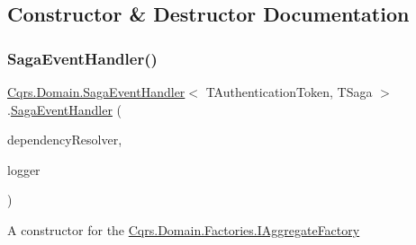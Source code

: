 \subsection{Constructor \& Destructor Documentation}
\mbox{\label{classCqrs_1_1Domain_1_1SagaEventHandler_a4ad68643dd845330a96c71039cf0897f}} 
\subsubsection{\texorpdfstring{Saga\+Event\+Handler()}{SagaEventHandler()}\hspace{0.1cm}{\footnotesize\ttfamily [1/2]}}
{\footnotesize\ttfamily \hyperlink{classCqrs_1_1Domain_1_1SagaEventHandler}{Cqrs.\+Domain.\+Saga\+Event\+Handler}$<$ T\+Authentication\+Token, T\+Saga $>$.\hyperlink{classCqrs_1_1Domain_1_1SagaEventHandler}{Saga\+Event\+Handler} (\begin{DoxyParamCaption}\item[{\hyperlink{interfaceCqrs_1_1Configuration_1_1IDependencyResolver}{I\+Dependency\+Resolver}}]{dependency\+Resolver,  }\item[{I\+Logger}]{logger }\end{DoxyParamCaption})\hspace{0.3cm}{\ttfamily [protected]}}



A constructor for the \hyperlink{interfaceCqrs_1_1Domain_1_1Factories_1_1IAggregateFactory}{Cqrs.\+Domain.\+Factories.\+I\+Aggregate\+Factory} 

\mbox{\label{classCqrs_1_1Domain_1_1SagaEventHandler_a061ebe3676b158d952b26629195df627}} 
